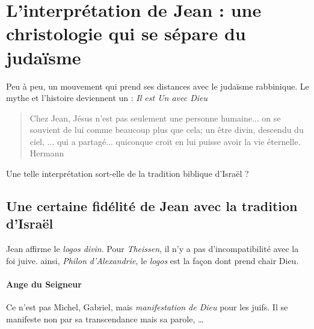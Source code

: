  
  
  \section{L'interprétation de Jean : une christologie qui se sépare du
  judaïsme} 
   
   \begin{Synthesis}
       Peu à peu, un mouvement qui prend ses distances avec le judaïsme rabbinique.
       Le mythe et l'histoire deviennent un : \textit{Il est Un avec Dieu}
   \end{Synthesis}
 
 
 \begin{quote}
     Chez Jean, Jésus n'est pas seulement une personne humaine... on se souvient de lui comme beaucoup plus que cela; un être divin, descendu du ciel, ... qui a partagé... quiconque croit en lui puisse avoir la vie éternelle.
     Hermann
 \end{quote}
 
   Une telle interprétation sort-elle de la tradition biblique d'Israël ?
     
    \subsection{Une certaine fidélité de Jean avec la tradition d'Israël}
    
    Jean affirme le \textit{logos divin}. Pour \textit{Theissen}, il n'y a pas d'incompatibilité avec la foi juive. ainsi, \textit{Philon d'Alexandrie}, le \emph{logos} est la façon dont prend chair Dieu. 
    
    \paragraph{Ange du Seigneur} Ce n'est pas Michel, Gabriel, mais \textit{manifestation de Dieu} pour les juifs. Il se manifeste non par sa transcendance mais sa parole, \ldots
    
